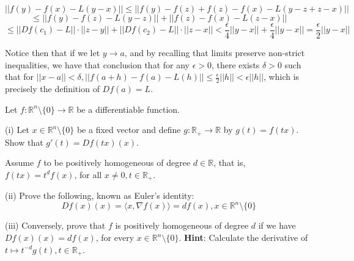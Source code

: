 \begin{solution}
    $$\lvert \lvert f(y) - f(x) - L(y - x) \rvert \rvert \leq \lvert \lvert f(y) - f(z) + f(z) - f(x) - L(y - z + z - x) \rvert \rvert$$
    $$\leq \lvert \lvert f(y) - f(z) - L(y - z) \rvert \rvert + \lvert \lvert f(z) - f(x) - L(z - x) \rvert \rvert$$
    $$\leq \lvert \lvert Df(c_1) - L \rvert \rvert \cdot \lvert \lvert z - y \rvert \rvert + \lvert \lvert Df(c_2) - L \rvert \rvert \cdot \lvert \lvert z - x \rvert \rvert < \frac{\epsilon}{4}\lvert \lvert y - x \rvert \rvert + \frac{\epsilon}{4} \lvert \lvert y -x \rvert \rvert = \frac{\epsilon}{2} \lvert \lvert y - x \rvert \rvert$$

    Notice then that if we let $y \rightarrow a$, and by recalling that limits preserve non-strict inequalities, we have that conclusion that for any $\epsilon > 0$, there exists $\delta > 0$ such that for $\lvert \lvert x - a \rvert \rvert < \delta, \lvert \lvert f(a+ h) - f(a) - L(h) \rvert \rvert \leq \frac{\epsilon}{2} \lvert \lvert h \rvert \rvert < \epsilon \lvert \lvert h \rvert \rvert$, which is precisely the definition of $Df(a) = L$.
\end{solution}

\begin{exercise}{32}
    Let $f: \mathbb{R}^n \setminus \{0\} \rightarrow \mathbb{R}$ be a differentiable function.

    (i) Let $x \in \mathbb{R}^n \setminus \{0\}$ be a fixed vector and define $g: \mathbb{R}_{+} \rightarrow \mathbb{R}$ by $g(t) = f(tx)$.
    Show that $g'(t) = D f(tx)(x)$.

    Assume $f$ to be positively homogeneous of degree $d \in \mathbb{R}$, that is, $f(tx) = t^df(x)$, for all $x \neq 0, t \in \mathbb{R}_{+}$.

    (ii) Prove the following, known as Euler's identity:
    $$Df(x)(x) = \langle x, \nabla f(x) \rangle = d f(x), x \in \mathbb{R}^n \setminus \{0\}$$

    (iii) Conversely, prove that $f$ is positively homogeneous of degree $d$ if we have $Df(x)(x) = df(x)$, for every $x \in \mathbb{R}^n \setminus \{0\}$. \textbf{Hint}: Calculate the derivative of $t \mapsto t^{-d}g(t), t \in \mathbb{R}_{+}$.
\end{exercise}

